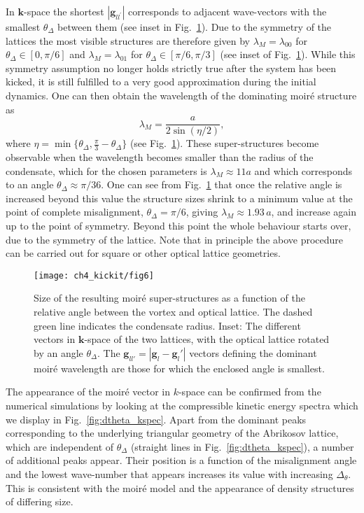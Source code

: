     In $\mathbf{k}$-space the shortest $|\mathbf{g}_{ll^\prime}|$ corresponds to adjacent wave-vectors with the smallest $\theta_\Delta$ between them (see inset in Fig.~\ref{fig:moire_lambda_1}). Due to the symmetry of the lattices the most visible structures are therefore given by $\lambda_M=\lambda_{00}$ for $\theta_\Delta\in[0,\pi/6]$ and $\lambda_M=\lambda_{01}$ for $\theta_\Delta\in[\pi/6,\pi/3]$ (see inset of Fig.~\ref{fig:moire_lambda_1}).
    While this symmetry assumption no longer holds strictly true after the system has been kicked, it is still fulfilled to a very good approximation during the initial dynamics. One can then obtain the wavelength of the dominating moir\'e structure as~\cite{jns-moire,nphys2272}
    		\begin{equation}
    		\lambda_M = \frac{a}{2\sin(\eta/2)},
    		\label{eqn:moire_size}
    	\end{equation}
    where $\eta=\min\{\theta_\Delta,\frac{\pi}{3} - \theta_\Delta \} $  (see Fig.~\ref{fig:moire_lambda_1}).
These super-structures become observable when the wavelength becomes smaller than the radius of the condensate, which for the chosen parameters is $\lambda_M \approx 11a$ and which corresponds to an angle $\theta_\Delta \approx \pi/36$.
One can see from Fig.~\ref{fig:moire_lambda_1} that once the relative angle is increased beyond this value
the structure sizes shrink to a minimum value at the point of complete misalignment, $\theta_\Delta=\pi/6$, giving $\lambda_M\approx 1.93\,a$, and increase again up to the point of symmetry. Beyond this point the whole behaviour starts over, due to the symmetry of the lattice. Note that in principle the above procedure can be carried out for square or other optical lattice geometries.

\begin{figure}[tb]
	\texttt{[image: ch4\_kickit/fig6]}
	\caption{Size of the resulting moir\'e super-structures as a function of the relative angle between the vortex and optical lattice. The dashed green line indicates the condensate radius. Inset: The different vectors in $\mathbf{k}$-space of the two lattices, with the optical lattice rotated by an angle $\theta_\Delta$. The $\mathbf{g}_{ll'} = |\mathbf{g}_l - \mathbf{g}_l'|$ vectors defining the dominant moir\'e wavelength are those for which the enclosed angle is smallest. }
	\label{fig:moire_lambda_1}
\end{figure}

    The appearance of the moir\'e vector in $k$-space can be confirmed from the numerical simulations by looking at the compressible kinetic energy spectra which we display in Fig.~\ref{fig:dtheta_kspec}. Apart from the dominant peaks corresponding to the underlying triangular geometry of the Abrikosov lattice, which are independent of $\theta_\Delta$ (straight lines in Fig.~\ref{fig:dtheta_kspec}), a number of additional peaks appear. Their position is a function of the misalignment angle and the lowest wave-number that appears increases its value with increasing $\Delta_\theta$. This is consistent with the moir\'e model and the appearance of density structures of differing size.

